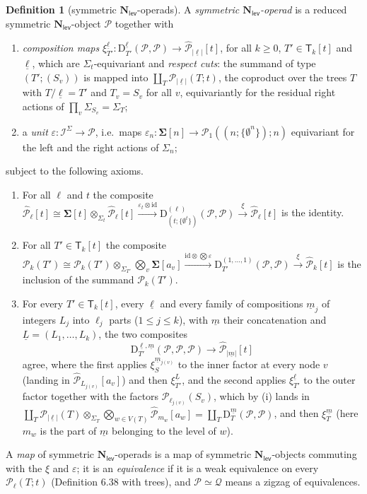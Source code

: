 \documentclass[12pt]{article}
\theoremstyle{plain}
\theoremstyle{definition}
\newtheorem{cdefinition}[ctheorem]{Definition}
\theoremstyle{remark}
\newcommand{\Cal}[1]{\mathcal{#1}}
\newcommand{\Nl}{\mathbf{N}_{\mathsf{lev}}}
\newcommand{\Isym}{\Cal{I}^{\Sigma}}
\newcommand{\id}{\mathrm{id}}
\newcommand{\Tr}{\mathsf{T}}
\newcommand{\Dm}{\mathrm{D}}
\begin{document}
\begin{cdefinition}[symmetric $\Nl$-operads]\label{cdef:operad}
A \emph{symmetric $\Nl$-operad} is a reduced symmetric $\Nl$-object $\Cal P$ together with
\begin{enumerate}[label=(\roman*),leftmargin=2em]
\item \emph{composition maps} $\xi^{\underline\ell}_{T'}\colon\Dm^{\underline\ell}_{T'}(\Cal P,\Cal P)\to\widehat{\Cal P}_{|\underline\ell|}[t]$, for all $k\geq0$, $T'\in\Tr_k[t]$ and $\underline\ell$, which are $\Sigma_t$-equivariant and \emph{respect cuts}: the summand of type $(T';(S_v))$ is mapped into $\coprod_T\Cal P_{|\underline\ell|}(T;t)$, the coproduct over the trees $T$ with $T/\underline\ell=T'$ and $T_v=S_v$ for all $v$, equivariantly for the residual right actions of $\prod_v\Sigma_{S_v}=\Sigma_T$;
\item a \emph{unit} $\varepsilon\colon\Isym\to\Cal P$, i.e.\ maps $\varepsilon_n\colon\mathbf\Sigma[n]\to\Cal P_1((n;\{\emptyset^n\});n)$ equivariant for the left and the right actions of $\Sigma_n$;
\end{enumerate}
subject to the following axioms.
\begin{enumerate}[label=(\Alph*),leftmargin=2em]
\item[(U1)] For all $\ell$ and $t$ the composite $\widehat{\Cal P}_\ell[t]\cong\mathbf\Sigma[t]\otimes_{\Sigma_t}\widehat{\Cal P}_\ell[t]\xrightarrow{\varepsilon_t\otimes\id}\Dm^{(\ell)}_{(t;\{\emptyset^t\})}(\Cal P,\Cal P)\xrightarrow{\xi}\widehat{\Cal P}_\ell[t]$ is the identity.
\item[(U2)] For all $T'\in\Tr_k[t]$ the composite $\Cal P_k(T')\cong\Cal P_k(T')\otimes_{\Sigma_{T'}}\bigotimes_v\mathbf\Sigma[a_v]\xrightarrow{\id\otimes\bigotimes\varepsilon}\Dm^{(1,\dots,1)}_{T'}(\Cal P,\Cal P)\xrightarrow{\xi}\widehat{\Cal P}_k[t]$ is the inclusion of the summand $\Cal P_k(T')$.
\item[(A)] For every $T'\in\Tr_k[t]$, every $\underline\ell$ and every family of compositions $\underline m_j$ of integers $L_j$ into $\ell_j$ parts ($1\leq j\leq k$), with $\underline m$ their concatenation and $\underline L=(L_1,\dots,L_k)$, the two composites
\[\Dm^{\underline\ell,\underline m}_{T'}(\Cal P,\Cal P,\Cal P)\longrightarrow\widehat{\Cal P}_{|\underline m|}[t]\]
agree, where the first applies $\xi^{\underline m_{j(v)}}_S$ to the inner factor at every node $v$ (landing in $\widehat{\Cal P}_{L_{j(v)}}[a_v]$) and then $\xi^{\underline L}_{T'}$, and the second applies $\xi^{\underline\ell}_{T'}$ to the outer factor together with the factors $\Cal P_{\ell_{j(v)}}(S_v)$, which by (i) lands in $\coprod_T\Cal P_{|\underline\ell|}(T)\otimes_{\Sigma_T}\bigotimes_{w\in V(T)}\widehat{\Cal P}_{m_{w}}[a_w]=\coprod_T\Dm^{\underline m}_T(\Cal P,\Cal P)$, and then $\xi^{\underline m}_T$ (here $m_w$ is the part of $\underline m$ belonging to the level of $w$).
\end{enumerate}
A \emph{map} of symmetric $\Nl$-operads is a map of symmetric $\Nl$-objects commuting with the $\xi$ and $\varepsilon$; it is an \emph{equivalence} if it is a weak equivalence on every $\Cal P_\ell(T;t)$ (Definition 6.38 with trees), and $\Cal P\simeq\Cal Q$ means a zigzag of equivalences.
\end{cdefinition}
\end{document}
